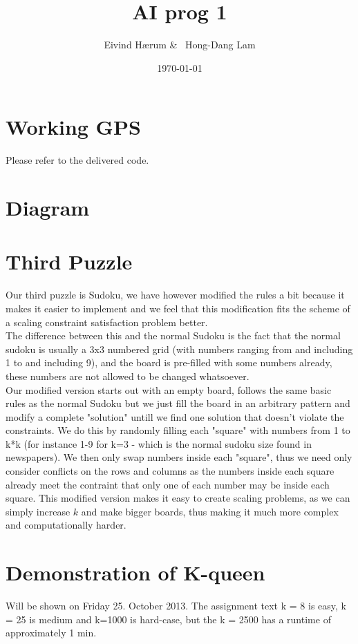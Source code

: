 \documentclass[12pt, a4paper]{article}
\title{AI prog 1}
\author{Eivind Hærum \& \ Hong-Dang Lam}
\date{\today} %
\begin{document}
\maketitle
% 
% 
 
\newpage
\tableofcontents
\newpage
 
\section{Working GPS}
Please refer to the delivered code.

\section{Diagram}

\section{Third Puzzle}
Our third puzzle is Sudoku, we have however modified the rules a bit because it makes it easier to implement and we feel that this modification fits the scheme of a scaling constraint satisfaction problem better.\\
The difference between this and the normal Sudoku is the fact that the normal sudoku is usually a 3x3 numbered grid (with numbers ranging from and including 1 to and including 9), and the board is pre-filled with some numbers already, these numbers are not allowed to be changed whatsoever.\\
Our modified version starts out with an empty board, follows the same basic rules as the normal Sudoku but we just fill the board in an arbitrary pattern and modify a complete "solution" untill we find one solution that doesn't violate the constraints. We do this by randomly filling each "square" with numbers from 1 to k*k (for instance 1-9 for k=3 - which is the normal sudoku size found in newspapers). We then only swap numbers inside each "square", thus we need only consider conflicts on the rows and columns as the numbers inside each square already meet the contraint that only one of each number may be inside each square. This modified version makes it easy to create scaling problems, as we can simply increase $k$ and make bigger boards, thus making it much more complex and  computationally harder.

\section{Demonstration of K-queen}
Will be shown on Friday 25. October 2013.
The assignment text  k = 8 is easy, k = 25 is medium and k=1000 is hard-case, but the k = 2500 has a runtime of approximately 1 min.
\end{document}
